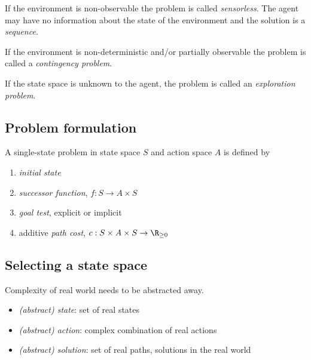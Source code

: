 \documentclass{article}
\begin{document}
\begin{definition}
    If the environment is non-observable the problem is called
    \emph{sensorless}. The agent may have no information about
    the state of the environment and the solution is a
    \emph{sequence}.
\end{definition}

\begin{definition}
    If the environment is non-deterministic and/or partially 
    observable the problem is called a \emph{contingency problem}.
\end{definition}

\begin{definition}
    If the state space is unknown to the agent, the problem is
    called an \emph{exploration problem}.
\end{definition}

\subsection{Problem formulation}

\begin{definition}
    A single-state problem in state space $S$
    and action space $A$ is defined by
    \begin{enumerate}
        \item \emph{initial state}
        \item \emph{successor function}, $f:S\to A\times S$
        \item \emph{goal test}, explicit or implicit
        \item additive \emph{path cost}, $c:S\times A\times S\to\R_{\geq 0}$
    \end{enumerate}
\end{definition}

\subsection{Selecting a state space}

Complexity of real world needs to be abstracted away.
\begin{itemize}
    \item \emph{(abstract) state}: set of real states
    \item \emph{(abstract) action}: complex combination of real actions
    \item \emph{(abstract) solution}: set of real paths, solutions in the real world
\end{itemize}
\end{document}
